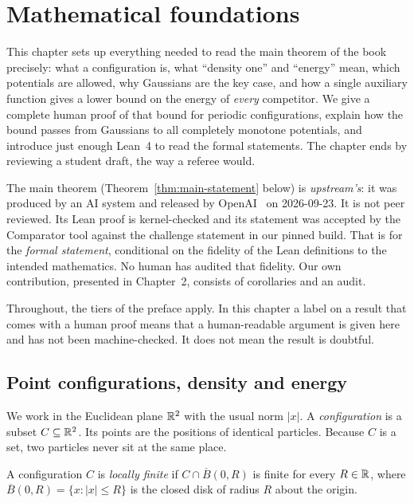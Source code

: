 \chapter{Mathematical foundations}
\label{ch:foundations}

This chapter sets up everything needed to read the main theorem of the book precisely: what a configuration is,
what ``density one'' and ``energy'' mean, which potentials are allowed, why Gaussians are the key case, and how a
single auxiliary function gives a lower bound on the energy of \emph{every} competitor. We give a complete human proof
of that bound for periodic configurations, explain how the bound passes from Gaussians to all completely monotone
potentials, and introduce just enough Lean~4 to read the formal statements. The chapter ends by reviewing a student
draft, the way a referee would.

\begin{warnbox}
The main theorem (Theorem~\ref{thm:main-statement} below) is \emph{upstream's}: it was produced by an AI system and
released by OpenAI~\cite{oai} on 2026-09-23. It is not peer reviewed. Its Lean proof is kernel-checked and its
statement was accepted by the Comparator tool against the challenge statement in our pinned build. That is
\tierA{} for the \emph{formal statement}, conditional on the fidelity of the Lean definitions to the intended
mathematics. No human has audited that fidelity. Our own contribution, presented in Chapter~2, consists of corollaries
and an audit.
\end{warnbox}

Throughout, the tiers of the preface apply. In this chapter a \tierC{} label on a result that comes with a human
proof means that a human-readable argument is given here and has not been machine-checked. It does not mean the result
is doubtful.

\section{Point configurations, density and energy}
\label{sec:configs}

We work in the Euclidean plane $\mathbb{R}^2$ with the usual norm $|x|$. A \emph{configuration} is a subset $C\subseteq\mathbb{R}^2$.
Its points are the positions of identical particles. Because $C$ is a set, two particles never sit at the same place.

\begin{definition}\label{def:lf}
A configuration $C$ is \emph{locally finite} if $C\cap \overline{B}(0,R)$ is finite for every $R\in\mathbb{R}$, where
$\overline{B}(0,R)=\{x:|x|\le R\}$ is the closed disk of radius $R$ about the origin.
\end{definition}

